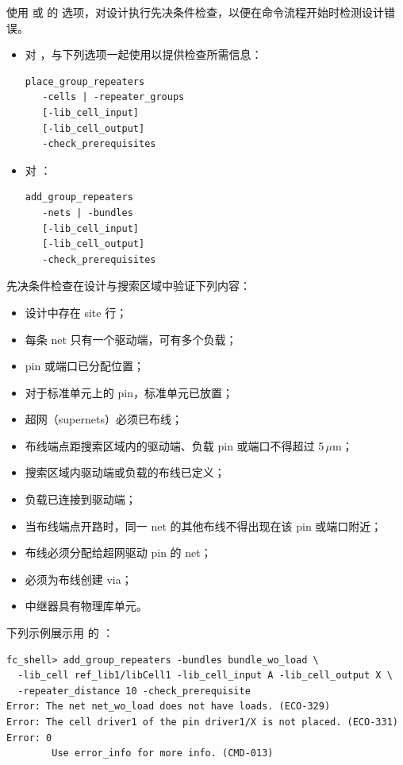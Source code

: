 使用  或  的  选项，对设计执行先决条件检查，以便在命令流程开始时检测设计错误。

\begin{itemize}
  \item 对 ，与下列选项一起使用以提供检查所需信息：
\begin{lstlisting}
place_group_repeaters
   -cells | -repeater_groups
   [-lib_cell_input]
   [-lib_cell_output]
   -check_prerequisites
\end{lstlisting}
  \item 对 ：
\begin{lstlisting}
add_group_repeaters
   -nets | -bundles
   [-lib_cell_input]
   [-lib_cell_output]
   -check_prerequisites
\end{lstlisting}
\end{itemize}

先决条件检查在设计与搜索区域中验证下列内容：
\begin{itemize}
  \item 设计中存在 site 行；
  \item 每条 net 只有一个驱动端，可有多个负载；
  \item pin 或端口已分配位置；
  \item 对于标准单元上的 pin，标准单元已放置；
  \item 超网（supernets）必须已布线；
  \item 布线端点距搜索区域内的驱动端、负载 pin 或端口不得超过 5\,$\mu$m；
  \item 搜索区域内驱动端或负载的布线已定义；
  \item 负载已连接到驱动端；
  \item 当布线端点开路时，同一 net 的其他布线不得出现在该 pin 或端口附近；
  \item 布线必须分配给超网驱动 pin 的 net；
  \item 必须为布线创建 via；
  \item 中继器具有物理库单元。
\end{itemize}

下列示例展示用  的 ：
\begin{lstlisting}
fc_shell> add_group_repeaters -bundles bundle_wo_load \
  -lib_cell ref_lib1/libCell1 -lib_cell_input A -lib_cell_output X \
  -repeater_distance 10 -check_prerequisite
Error: The net net_wo_load does not have loads. (ECO-329)
Error: The cell driver1 of the pin driver1/X is not placed. (ECO-331)
Error: 0
        Use error_info for more info. (CMD-013)
\end{lstlisting}

